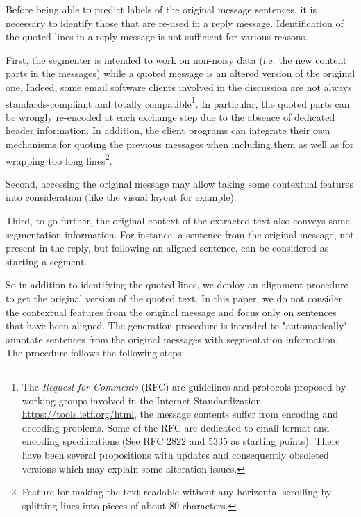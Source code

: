 Before being able to predict labels of the original message sentences, it is necessary to identify those that are re-used in a reply message. 
%
Identification of the quoted lines in a reply message is not sufficient for various reasons. 

First, the segmenter is intended to work on non-noisy data (i.e. the new content parts in the messages) while a quoted message is an altered version of the original one. 
% 
Indeed, some email software clients involved in the discussion are not always standards-compliant and totally compatible\footnote{The \textit{Request for Comments} (RFC) are guidelines and protocols proposed by working groups involved in the Internet Standardization \url{https://tools.ietf.org/html}, the message contents suffer from encoding and decoding problems. Some of the RFC are dedicated to email format and encoding specifications (See RFC 2822 and 5335 as starting points). There have been several propositions with updates and consequently obsoleted versions which may explain some alteration issues.}. 
%
In particular, the quoted parts can be wrongly re-encoded at each exchange step due to the absence of dedicated header information.
% 
In addition, the client programs can integrate their own mechanisms for quoting the previous messages when including them as well as for wrapping too long lines\footnote{Feature for making the text readable without any horizontal scrolling by splitting lines into pieces of about 80 characters.}.

Second, accessing the original message may allow taking some contextual features into consideration (like the visual layout for example). 

Third, to go further, the original context of the extracted text also conveys some segmentation information. For instance, a sentence from the original message, not present in the reply, but following an aligned sentence, can be considered as starting a segment.

So in addition to identifying the quoted lines, we deploy an alignment procedure to get the original version of the quoted text. 
In this paper, we do not consider the contextual features from the original message and focus only on sentences that have been aligned. 
% 
The generation procedure is intended to "automatically" annotate sentences from the original messages with segmentation information.
% 
The procedure follows the following steps:

